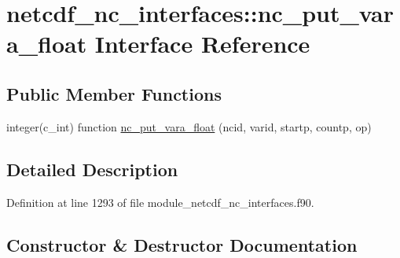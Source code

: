 \hypertarget{interfacenetcdf__nc__interfaces_1_1nc__put__vara__float}{}\section{netcdf\+\_\+nc\+\_\+interfaces\+:\+:nc\+\_\+put\+\_\+vara\+\_\+float Interface Reference}
\label{interfacenetcdf__nc__interfaces_1_1nc__put__vara__float}
\subsection*{Public Member Functions}
\begin{DoxyCompactItemize}
\item 
integer(c\+\_\+int) function \hyperlink{interfacenetcdf__nc__interfaces_1_1nc__put__vara__float_aa48532bb1ee5b6c8c0eea6a4422b64f2}{nc\+\_\+put\+\_\+vara\+\_\+float} (ncid, varid, startp, countp, op)
\end{DoxyCompactItemize}


\subsection{Detailed Description}


Definition at line 1293 of file module\+\_\+netcdf\+\_\+nc\+\_\+interfaces.\+f90.



\subsection{Constructor \& Destructor Documentation}
\mbox{\label{interfacenetcdf__nc__interfaces_1_1nc__put__vara__float_aa48532bb1ee5b6c8c0eea6a4422b64f2}} 
